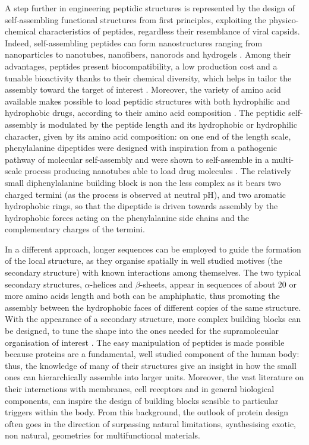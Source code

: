 A step further in engineering peptidic structures is represented by the design of self-assembling functional structures from first principles, exploiting the physico-chemical characteristics of peptides, regardless their resemblance of viral capsids.
%
Indeed, self-assembling peptides can form nanostructures ranging from nanoparticles to nanotubes, nanofibers, nanorods and hydrogels \cite{Fan2017,Habibi2016}.
%
Among their advantages, peptides present biocompatibility, a low production cost and a tunable bioactivity thanks to their chemical diversity, which helps in tailor the assembly toward the target of interest \cite{Fan2017}. Moreover, the variety of amino acid available makes possible to load peptidic structures with both hydrophilic and hydrophobic drugs, according to their amino acid composition \cite{Habibi2016,Ma2012}.
%
The peptidic self-assembly is modulated by the peptide length and its hydrophobic or hydrophilic character, given by its amino acid composition: on one end of the length scale, phenylalanine dipeptides were designed with inspiration from a pathogenic pathway of molecular self-assembly \cite{Yan2010} and were shown to self-assemble in a multi-scale process producing nanotubes able to load drug molecules \cite{Silva2013}. The relatively small diphenylalanine building block is non the less complex as it bears two charged termini (as the process is observed at neutral pH), and two aromatic hydrophobic rings, so that the dipeptide is driven towards assembly by the hydrophobic forces acting on the phenylalanine side chains and the complementary charges of the termini.

In a different approach, longer sequences can be employed to guide the formation of the local structure, as they organise spatially in well studied motives (the secondary structure) with known interactions among themselves.
%
The two typical secondary structures, $\alpha$-helices and $\beta$-sheets, appear in sequences of about 20 or more amino acids length and both can be amphiphatic, thus promoting the assembly between the hydrophobic faces of different copies of the same structure. With the appearance of a secondary structure, more complex building blocks can be designed, to tune the shape into the ones needed for the supramolecular organisation of interest \cite{King2014}.
%
The easy manipulation of peptides is made possible because proteins are a fundamental,  well studied component of the human body: thus, the knowledge of many of their structures\cite{PDB} give an insight in how the small ones can hierarchically assemble into larger units.
%
Moreover, the vast literature on their interactions with membranes, cell receptors and in general biological components, can inspire the design of building blocks sensible to particular triggers within the body. From this background, the outlook of protein design often goes in the direction of surpassing natural limitations, synthesising exotic, non natural, geometries \cite{Yeates2019,Malay2019} for multifunctional materials.


